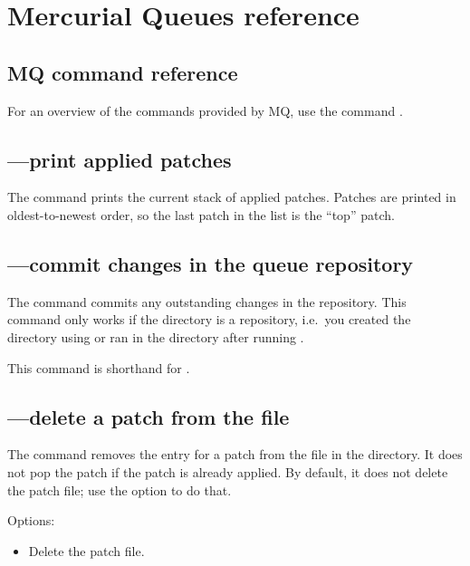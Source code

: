 \chapter{Mercurial Queues reference}
\label{chap:mqref}

\section{MQ command reference}
\label{sec:mqref:cmdref}

For an overview of the commands provided by MQ, use the command
.

\section{---print applied patches}

The  command prints the current stack of applied
patches.  Patches are printed in oldest-to-newest order, so the last
patch in the list is the ``top'' patch.

\section{---commit changes in the queue repository}

The  command commits any outstanding changes in the
 repository.  This command only works if the
 directory is a repository, i.e.~you created the
directory using  or ran
 in the directory after running .

This command is shorthand for .

\section{---delete a patch from the
   file}

The  command removes the entry for a patch from the
 file in the  directory.  It
does not pop the patch if the patch is already applied.  By default,
it does not delete the patch file; use the  option to
do that.

Options:
\begin{itemize}
\item[\hgxopt{mq}{qdel}{-f}] Delete the patch file.
\end{itemize}

